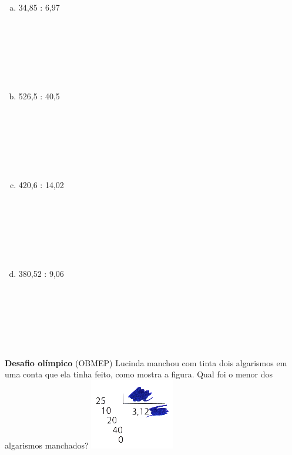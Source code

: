 \documentclass[a4paper,14pt]{article}
\begin{document}
\begin{multicols}{2}
\begin{enumerate}
\begin{enumerate}[a)]
   				\item 34,85 : 6,97 \\\\\\\\\\\\\\
   				\item 526,5 : 40,5 \\\\\\\\\\\\\\
   				\item 420,6 : 14,02 \\\\\\\\\\\\\\
   				\item 380,52 : 9,06 \\\\\\\\\\\\\\
   			\end{enumerate}
   			\textbf{Desafio olímpico}
   			(OBMEP) Lucinda manchou com tinta dois algarismos em uma conta que ela tinha feito, como mostra a figura. Qual foi o menor dos algarismos manchados?
   			\includegraphics[width=1\linewidth]{6FMA77_imagens/imagem2}

\end{enumerate}
\end{multicols}
\end{document}
